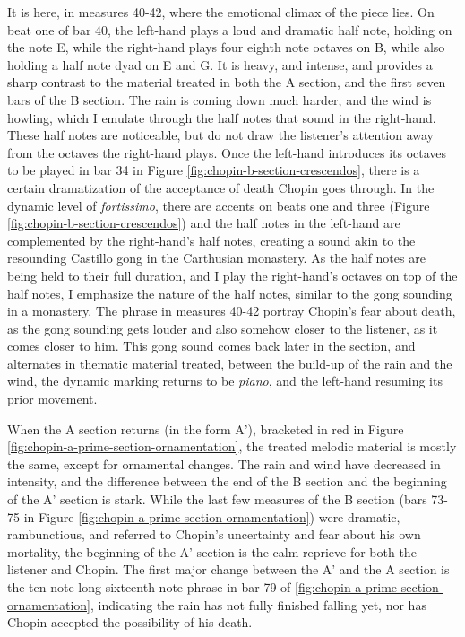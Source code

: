 It is here, in measures 40-42, where the emotional climax of the piece lies. On beat one of bar 40, the left-hand plays a loud and dramatic half note, holding on the note E, while the right-hand plays four eighth note octaves on B, while also holding a half note dyad on E and G\musSharp{}. It is heavy, and intense, and provides a sharp contrast to the material treated in both the A  section, and the first seven bars of the B section. The rain is coming down much harder, and the wind is howling, which I emulate through the half notes that sound in the right-hand. These half notes are noticeable, but do not draw the listener's attention away from the octaves the right-hand plays. Once the left-hand introduces its octaves to be played in bar 34 in Figure \ref{fig:chopin-b-section-crescendos}\autocite{Hansen_1973}, there is a certain dramatization of the acceptance of death Chopin goes through. In the dynamic level of \textit{fortissimo}, there are accents on beats one and three (Figure \ref{fig:chopin-b-section-crescendos}\autocite{Hansen_1973}) and the half notes in the left-hand are complemented by the right-hand's half notes, creating a sound akin to the resounding Castillo gong in the Carthusian monastery. As the half notes are being held to their full duration, and I play the right-hand's octaves on top of the half notes, I emphasize the nature of the half notes, similar to the gong sounding in a monastery. The phrase in measures 40-42 portray Chopin's fear about death, as the gong sounding gets louder and also somehow closer to the listener, as it comes closer to him. This gong sound comes back later in the section, and alternates in thematic material treated, between the build-up of the rain and the wind, the dynamic marking returns to be \textit{piano}, and the left-hand resuming its prior movement. 

When the A section returns (in the form A'), bracketed in red in Figure \ref{fig:chopin-a-prime-section-ornamentation}\autocite{Hansen_1973}, the treated melodic material is mostly the same, except for ornamental changes. The rain and wind have decreased in intensity, and the difference between the end of the B section and the beginning of the A' section is stark. While the last few measures of the B section (bars 73-75 in Figure \ref{fig:chopin-a-prime-section-ornamentation}\autocite{Hansen_1973}) were dramatic, rambunctious, and referred to Chopin's uncertainty and fear about his own mortality, the beginning of the A' section is the calm reprieve for both the listener and Chopin. The first major change between the A' and the A section is the ten-note long sixteenth note phrase in bar 79 of  \ref{fig:chopin-a-prime-section-ornamentation}\autocite{Hansen_1973}, indicating the rain has not fully finished falling yet, nor has Chopin accepted the possibility of his death. 

